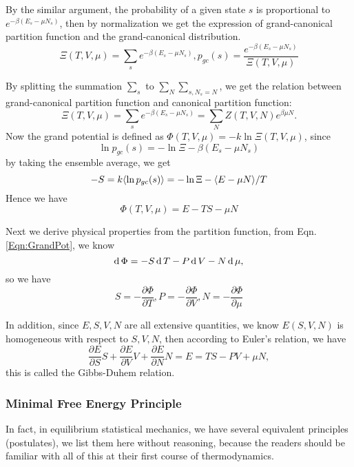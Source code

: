 By the similar argument, the probability of a given state $s$ is proportional to $e^{-\beta(E_s-\mu N_s)}$, then by normalization we get the expression of grand-canonical partition function and the grand-canonical distribution.
\begin{equation}
	\Xi(T,V,\mu)=\sum_se^{-\beta (E_s-\mu N_s)}, p_{gc}(s) = \frac{e^{-\beta (E_s-\mu N_s)}}{\Xi(T,V,\mu)}
\end{equation}

By splitting  the summation $\sum_s$ to $\sum_N\sum_{s, N_s=N}$, we get the relation between grand-canonical partition function and canonical partition function:
\begin{equation}
	\Xi(T,V,\mu) = \sum_s e^{-\beta (E_s-\mu N_s)} =\sum_N Z(T,V,N)e^{\beta \mu N}.
\end{equation}
Now the grand potential is defined as $\Phi(T,V,\mu)=-k\ln\Xi(T,V,\mu)$, since
\begin{equation}
	\ln p_{gc}(s) = -\ln\Xi - \beta (E_s - \mu N_s)
\end{equation}
by taking the ensemble average, we get
\begin{equation}
	-S = k\langle{\ln p_{gc}(s)}\rangle = -\ln\Xi - \langle{E-\mu N}\rangle/T
\end{equation}
Hence we have
\begin{equation}\label{Eqn:GrandPot}
	\Phi(T,V,\mu) = E - TS - \mu N
\end{equation}

Next we derive physical properties from the partition function, from Eqn. \ref{Eqn:GrandPot}, we know
\begin{equation}
	\operatorname{d}\Phi = -S\operatorname{d}T - P\operatorname{d}V- N\operatorname{d}\mu,
\end{equation}
so we have
\begin{equation}
	S=-\frac{\partial\Phi}{\partial T}, P = -\frac{\partial\Phi}{\partial V}, N = -\frac{\partial\Phi}{\partial\mu}
\end{equation}


In addition, since $E,S,V,N$ are all extensive quantities, we know $E(S,V,N)$ is homogeneous with respect to $S,V,N$, then according to Euler's relation, we have
\begin{equation}
	\frac{\partial E}{\partial S}S+\frac{\partial E}{\partial V}V+\frac{\partial E}{\partial N}N=E=TS-PV+\mu N,
\end{equation}
this is called the Gibbs-Duhem relation.

\subsubsection{Minimal Free Energy Principle}
In fact, in equilibrium statistical mechanics, we have several equivalent principles (postulates), we list them here without reasoning, because the readers should be familiar with all of this at their first course of thermodynamics.

